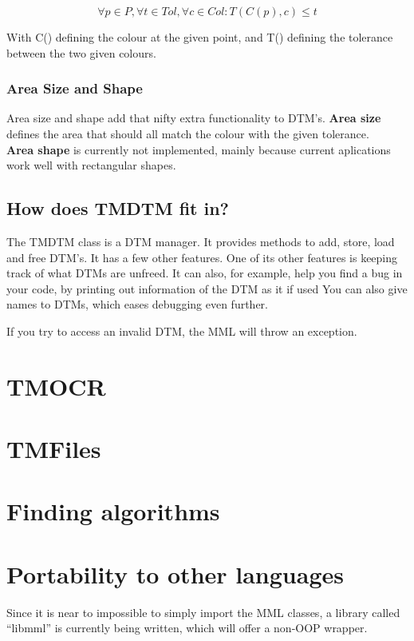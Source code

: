 \documentclass[a4paper, 10pt]{report} %
\begin{document}
$$ \forall p \in P, \forall t \in Tol, \forall c \in Col : T(C(p), c) \leq t
 $$

With C() defining the colour at the given point, and T() defining the tolerance
between the two given colours.

\subsubsection{Area Size and Shape}

Area size and shape add that nifty extra functionality to DTM's.
\textbf{Area size} defines the area that should all match the colour
with the given tolerance. \\
\textbf{Area shape} is currently not implemented, mainly because
current aplications work well with rectangular shapes.

\subsection{How does TMDTM fit in?}

The TMDTM class is a DTM manager. It provides methods to add, store, load
and free DTM's. It has a few other features. One of its other features
is keeping track of what DTMs are unfreed. It can also, for example, help you
find a bug in your code, by printing out information of the DTM as it if used 
You can also give names to DTMs, which eases debugging even further.

If you try to access an invalid DTM, the MML will throw an exception.

\section{TMOCR}

\section{TMFiles}

\section{Finding algorithms}

\section{Portability to other languages}

Since it is near to impossible to simply import the MML classes, a library
called ``libmml'' is currently being written, which will offer a non-OOP 
wrapper.
\end{document}
